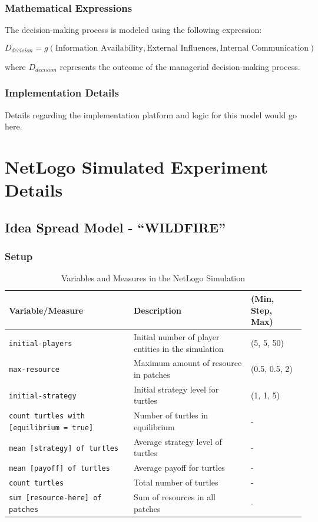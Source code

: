 \documentclass[sn-nature]{sn-jnl}%
\theoremstyle{thmstyleone}%
\theoremstyle{thmstyletwo}%
\theoremstyle{thmstylethree}%
\begin{document}
\subsubsection{Mathematical Expressions}
The decision-making process is modeled using the following expression:

\begin{equation}
D_{decision} = g(\text{Information Availability}, \text{External Influences}, \text{Internal Communication})
\end{equation}

where \( D_{decision} \) represents the outcome of the managerial decision-making process.

\subsubsection{Implementation Details}
Details regarding the implementation platform and logic for this model would go here.




\section{NetLogo Simulated Experiment Details}

\subsection{Idea Spread Model - \enquote{WILDFIRE}}
\subsubsection{Setup}
\begin{table}[h!]
\centering

\begin{tabular}{|l|l|l|}
\hline
\textbf{Variable/Measure} & \textbf{Description} & \textbf{(Min, Step, Max)} \\
\hline
\texttt{initial-players} & Initial number of player entities in the simulation & (5, 5, 50) \\
\hline
\texttt{max-resource} & Maximum amount of resource in patches & (0.5, 0.5, 2) \\
\hline
\texttt{initial-strategy} & Initial strategy level for turtles & (1, 1, 5) \\
\hline
\texttt{count turtles with [equilibrium = true]} & Number of turtles in equilibrium & - \\
\hline
\texttt{mean [strategy] of turtles} & Average strategy level of turtles & - \\
\hline
\texttt{mean [payoff] of turtles} & Average payoff for turtles & - \\
\hline
\texttt{count turtles} & Total number of turtles & - \\
\hline
\texttt{sum [resource-here] of patches} & Sum of resources in all patches & - \\
\hline
\end{tabular}
\caption{Variables and Measures in the NetLogo Simulation}
\label{tab:netlogo-vars-measures}
\end{table}
\end{document}
